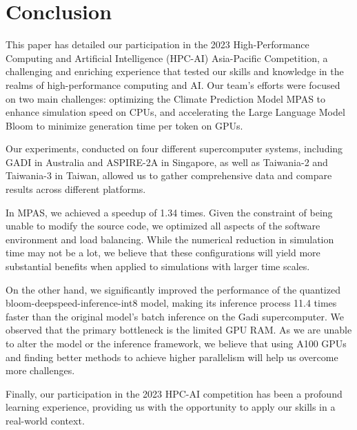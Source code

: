 \section{Conclusion}
This paper has detailed our participation in the 2023 High-Performance Computing and Artificial Intelligence (HPC-AI) Asia-Pacific Competition, a challenging and enriching experience that tested our skills and knowledge in the realms of high-performance computing and AI. Our team's efforts were focused on two main challenges: optimizing the Climate Prediction Model MPAS to enhance simulation speed on CPUs, and accelerating the Large Language Model Bloom to minimize generation time per token on GPUs.

Our experiments, conducted on four different supercomputer systems, including GADI in Australia and ASPIRE-2A in Singapore, as well as Taiwania-2 and Taiwania-3 in Taiwan, allowed us to gather comprehensive data and compare results across different platforms.

In MPAS, we achieved a speedup of 1.34 times. Given the constraint of being unable to modify the source code, we optimized all aspects of the software environment and load balancing. While the numerical reduction in simulation time may not be a lot, we believe that these configurations will yield more substantial benefits when applied to simulations with larger time scales.

On the other hand, we significantly improved the performance of the quantized bloom-deepspeed-inference-int8 model, making its inference process 11.4 times faster than the original model's batch inference on the Gadi supercomputer. We observed that the primary bottleneck is the limited GPU RAM. As we are unable to alter the model or the inference framework, we believe that using A100 GPUs and finding better methods to achieve higher parallelism will help us overcome more challenges.

Finally, our participation in the 2023 HPC-AI competition has been a profound learning experience, providing us with the opportunity to apply our skills in a real-world context.
\label{sec:conc}

